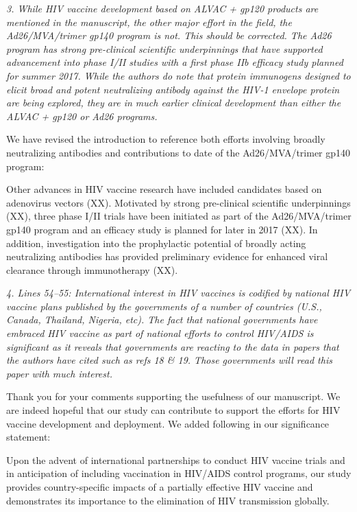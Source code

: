 \documentclass[12pt]{jpmletter}
\newenvironment{original}{\it}{}
\begin{document}
\begin{letter}{}
    \begin{original}
      3. While HIV vaccine development based on ALVAC + gp120 products
      are mentioned in the manuscript, the other major effort in the
      field, the Ad26/MVA/trimer gp140 program is not. This should be
      corrected. The Ad26 program has strong pre-clinical scientific
      underpinnings that have supported advancement into phase I/II
      studies with a first phase IIb efficacy study planned for summer
      2017. While the authors do note that protein immunogens designed
      to elicit broad and potent neutralizing antibody against the
      HIV-1 envelope protein are being explored, they are in much
      earlier clinical development than either the ALVAC + gp120 or
      Ad26 programs.
    \end{original}
    
    We have revised the introduction to reference both efforts
    involving broadly neutralizing antibodies and contributions to
    date of the Ad26/MVA/trimer gp140 program:
    \begin{quoting}
      Other advances in HIV vaccine research have included candidates
      based on adenovirus vectors (XX). Motivated by strong
      pre-clinical scientific underpinnings (XX), three phase I/II
      trials have been initiated as part of the Ad26/MVA/trimer gp140
      program and an efficacy study is planned for later in 2017
      (XX). In addition, investigation into the prophylactic potential
      of broadly acting neutralizing antibodies has provided
      preliminary evidence for enhanced viral clearance through
      immunotherapy (XX).
    \end{quoting}

    \begin{original}
      4. Lines 54–55: International interest in HIV vaccines is
      codified by national HIV vaccine plans published by the
      governments of a number of countries (U.S., Canada, Thailand,
      Nigeria, etc). The fact that national governments have embraced
      HIV vaccine as part of national efforts to control HIV/AIDS is
      significant as it reveals that governments are reacting to the
      data in papers that the authors have cited such as refs 18 \&
      19. Those governments will read this paper with much interest.
    \end{original}
    
    Thank you for your comments supporting the usefulness of our
    manuscript. We are indeed hopeful that our study can contribute to
    support the efforts for HIV vaccine development and deployment. We
    added following in our significance statement:
    \begin{quoting}
      Upon the advent of international partnerships to conduct HIV
      vaccine trials and in anticipation of including vaccination in
      HIV/AIDS control programs, our study provides country-specific
      impacts of a partially effective HIV vaccine and demonstrates
      its importance to the elimination of HIV transmission globally.
    \end{quoting}
    
  \end{letter}
\end{document}
